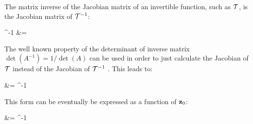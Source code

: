 The matrix inverse of the Jacobian matrix of an invertible function, such as $\mathcal{T}$,
is the Jacobian matrix of $\mathcal{T}^{-1}$: \cite{inverse-function-theorem}
    
\begin{nalign}
^{-1} &= 
\end{nalign}

The well known property of the determinant of inverse matrix $\det(A^{-1})= 1/\det(A)$
can be used in order to just calculate the Jacobian of $\mathcal{T}$ instead of the Jacobian of $\mathcal{T}^{-1}$
. This leads to:

\begin{nalign}\label{trprob_with_detd}
 &= \cdot {}^{-1}
\end{nalign}

This form can be eventually be expressed as a function of $\mathbf{z}_{0}$:

\begin{nalign}
 &= \cdot {}^{-1}
\end{nalign}
